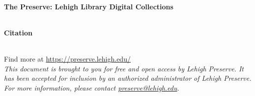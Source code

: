 \documentclass{article}
\begin{document}
\newcommand{\insertTitle}{}
\newcommand{\insertCitation}{}

\begin{titlepage}
    \begin{center}
        \vspace*{2cm}

        \\[1cm]
        {\Large\bfseries The Preserve: Lehigh Library Digital Collections}\\[2cm]

        {\Huge\bfseries \noindent \insertTitle}\\[3cm]
    \end{center}

    {\large \noindent \textbf{Citation}}\\[0.25cm]
    {\large \noindent \insertCitation}\\[1cm]

    \vfill

    \begin{center}
        {\sffamily Find more at \href{https://preserve.lehigh.edu/}{https://preserve.lehigh.edu/}}\\[0.5cm]

        {\sffamily\textit{This document is brought to you for free and open access by Lehigh Preserve. It has been accepted for inclusion by an authorized administrator of Lehigh Preserve. For more information, please contact \href{mailto:preserve@lehigh.edu}{preserve@lehigh.edu}.}}
    \end{center}
\end{titlepage}
\end{document}
